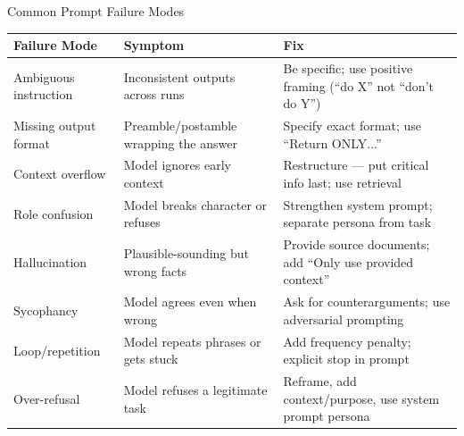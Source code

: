 \documentclass{beamer}
\begin{document}
\begin{frame}{Common Prompt Failure Modes}
    \begin{table}
        \centering
        \scriptsize
        \begin{tabular}{@{}p{2.5cm}p{3.5cm}p{3.5cm}@{}}
            \toprule
            \textbf{Failure Mode} & \textbf{Symptom} & \textbf{Fix} \\ \midrule
            Ambiguous instruction  & Inconsistent outputs across runs            & Be specific; use positive framing (``do X'' not ``don't do Y'') \\
            Missing output format  & Preamble/postamble wrapping the answer      & Specify exact format; use ``Return ONLY...'' \\
            Context overflow       & Model ignores early context                 & Restructure --- put critical info last; use retrieval \\
            Role confusion         & Model breaks character or refuses           & Strengthen system prompt; separate persona from task \\
            Hallucination          & Plausible-sounding but wrong facts          & Provide source documents; add ``Only use provided context'' \\
            Sycophancy             & Model agrees even when wrong                & Ask for counterarguments; use adversarial prompting \\
            Loop/repetition        & Model repeats phrases or gets stuck         & Add frequency penalty; explicit stop in prompt \\
            Over-refusal           & Model refuses a legitimate task             & Reframe, add context/purpose, use system prompt persona \\ \bottomrule
        \end{tabular}
    \end{table}
\end{frame}
\end{document}
